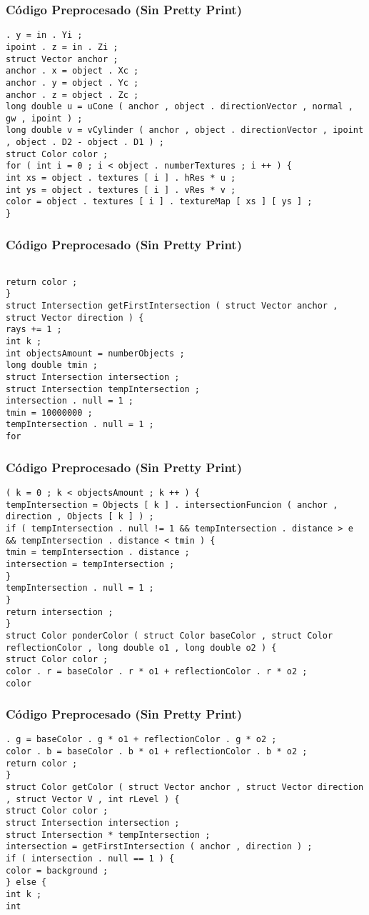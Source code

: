 \documentclass{beamer}
\begin{document}
\begin{frame}[fragile]
\frametitle{C\'odigo Preprocesado (Sin Pretty Print)}
\begin{lstlisting}[style=CStyle]
. y = in . Yi ; 
ipoint . z = in . Zi ; 
struct Vector anchor ; 
anchor . x = object . Xc ; 
anchor . y = object . Yc ; 
anchor . z = object . Zc ; 
long double u = uCone ( anchor , object . directionVector , normal , gw , ipoint ) ; 
long double v = vCylinder ( anchor , object . directionVector , ipoint , object . D2 - object . D1 ) ; 
struct Color color ; 
for ( int i = 0 ; i < object . numberTextures ; i ++ ) { 
int xs = object . textures [ i ] . hRes * u ; 
int ys = object . textures [ i ] . vRes * v ; 
color = object . textures [ i ] . textureMap [ xs ] [ ys ] ; 
} \end{lstlisting}
\end{frame}
\begin{frame}[fragile]
\frametitle{C\'odigo Preprocesado (Sin Pretty Print)}
\begin{lstlisting}[style=CStyle]

return color ; 
} 
struct Intersection getFirstIntersection ( struct Vector anchor , struct Vector direction ) { 
rays += 1 ; 
int k ; 
int objectsAmount = numberObjects ; 
long double tmin ; 
struct Intersection intersection ; 
struct Intersection tempIntersection ; 
intersection . null = 1 ; 
tmin = 10000000 ; 
tempIntersection . null = 1 ; 
for \end{lstlisting}
\end{frame}
\begin{frame}[fragile]
\frametitle{C\'odigo Preprocesado (Sin Pretty Print)}
\begin{lstlisting}[style=CStyle]
( k = 0 ; k < objectsAmount ; k ++ ) { 
tempIntersection = Objects [ k ] . intersectionFuncion ( anchor , direction , Objects [ k ] ) ; 
if ( tempIntersection . null != 1 && tempIntersection . distance > e && tempIntersection . distance < tmin ) { 
tmin = tempIntersection . distance ; 
intersection = tempIntersection ; 
} 
tempIntersection . null = 1 ; 
} 
return intersection ; 
} 
struct Color ponderColor ( struct Color baseColor , struct Color reflectionColor , long double o1 , long double o2 ) { 
struct Color color ; 
color . r = baseColor . r * o1 + reflectionColor . r * o2 ; 
color \end{lstlisting}
\end{frame}
\begin{frame}[fragile]
\frametitle{C\'odigo Preprocesado (Sin Pretty Print)}
\begin{lstlisting}[style=CStyle]
. g = baseColor . g * o1 + reflectionColor . g * o2 ; 
color . b = baseColor . b * o1 + reflectionColor . b * o2 ; 
return color ; 
} 
struct Color getColor ( struct Vector anchor , struct Vector direction , struct Vector V , int rLevel ) { 
struct Color color ; 
struct Intersection intersection ; 
struct Intersection * tempIntersection ; 
intersection = getFirstIntersection ( anchor , direction ) ; 
if ( intersection . null == 1 ) { 
color = background ; 
} else { 
int k ; 
int \end{lstlisting}
\end{frame}
\end{document}
